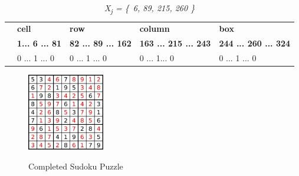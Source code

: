 \documentclass[a4paper,oneside,11pt]{report}
\begin{document}
\begin{table}[!ht]
\begin{tabular}{m{1cm} m{3cm} m{3cm} m{3cm} m{3cm}}
& \textbf{cell} & \textbf{row} & \textbf{column} & \textbf{box}\\ 
& \textbf{1\hspace{0.1cm}...\hspace{0.1cm} 6 \hspace{0.1cm}... \hspace{0.1cm}	81} & \textbf{82\hspace{0.1cm} ... 89 \hspace{0.1cm}... 162} & \textbf{163 ... 215 ... 243} & \textbf{244 ... 260 ... 324}\\ 
& 0 ...\hspace{0.1cm} 1 \hspace{0.1cm}... \hspace{0.1cm}	0 & 0 \hspace{0.2cm} ...\hspace{0.1cm} 1 \hspace{0.2cm}... \hspace{0.1cm}	0 & 0\hspace{0.4cm} ...\hspace{0.2cm} 1\hspace{0.28cm}... \hspace{0.1cm}0 & 0\hspace{0.4cm} ...\hspace{0.2cm} 1 \hspace{0.18cm}... \hspace{0.1cm}	0\\ 
\end{tabular}
\caption{{\itshape X\textsubscript{j} = \{\ 6, 89, 215, 260 \}}}
\end{table}

\begin{figure}[h]
  \centering
  {\includegraphics[width=0.3\textwidth]{Sudoku_Puzzle_Answer.jpg}\label{fig:puzzleanswer}}
  \caption{Completed Sudoku Puzzle}
\end{figure}
\end{document}
